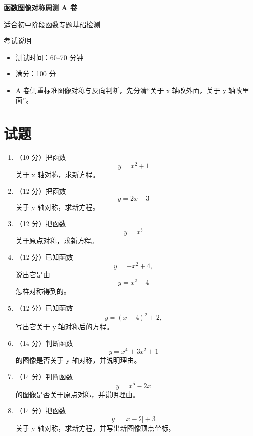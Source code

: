 \documentclass[11pt,a4paper,fontset=fandol]{ctexart}
\newcommand{\answerspace}{\vspace{2.3cm}}
\newcommand{\biganswerspace}{\vspace{3.1cm}}
\begin{document}
\thispagestyle{empty}
\begin{center}
{\fontsize{22}{28}\selectfont\bfseries 函数图像对称周测 A 卷\par}
\vspace{0.4cm}
{\large 适合初中阶段函数专题基础检测\par}
\end{center}

\begin{infobox}{考试说明}
\begin{itemize}
  \item 测试时间：60--70 分钟
  \item 满分：100 分
  \item A 卷侧重标准图像对称与反向判断，先分清“关于 x 轴改外面，关于 y 轴改里面”。
\end{itemize}
\end{infobox}

\section{试题}

\begin{enumerate}
  \item （10 分）把函数
  \[
  y=x^2+1
  \]
  关于 x 轴对称，求新方程。
  \answerspace

  \item （12 分）把函数
  \[
  y=2x-3
  \]
  关于 y 轴对称，求新方程。
  \answerspace

  \item （12 分）把函数
  \[
  y=x^3
  \]
  关于原点对称，求新方程。
  \answerspace

  \item （12 分）已知函数
  \[
  y=-x^2+4,
  \]
  说出它是由
  \[
  y=x^2-4
  \]
  怎样对称得到的。
  \answerspace

  \item （12 分）已知函数
  \[
  y=(x-4)^2+2,
  \]
  写出它关于 y 轴对称后的方程。
  \answerspace

  \item （14 分）判断函数
  \[
  y=x^4+3x^2+1
  \]
  的图像是否关于 y 轴对称，并说明理由。
  \biganswerspace

  \item （14 分）判断函数
  \[
  y=x^5-2x
  \]
  的图像是否关于原点对称，并说明理由。
  \biganswerspace

  \item （14 分）把函数
  \[
  y=|x-2|+3
  \]
  关于 y 轴对称，求新方程，并写出新图像顶点坐标。
  \biganswerspace
\end{enumerate}
\end{document}
